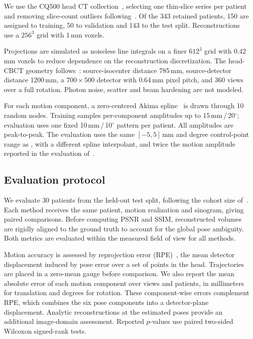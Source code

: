 \documentclass[11pt]{article}
\begin{document}
We use the CQ500 head CT collection~\cite{cq500}, selecting one thin-slice series per
patient and removing slice-count outliers following~\cite{thies25}. Of the 343
retained patients, 150 are assigned to training, 50 to validation and 143 to the test
split. Reconstructions use a $256^3$ grid with 1\,mm voxels.

Projections are simulated as noiseless line integrals on a finer $612^3$ grid with
0.42\,mm voxels to reduce dependence on the reconstruction discretization. The
head-CBCT geometry follows~\cite{thies25}: source-isocenter distance 785\,mm,
source-detector distance 1200\,mm, a $700\times500$ detector with 0.64\,mm pixel
pitch, and 360 views over a full rotation. Photon noise, scatter and beam hardening
are not modeled.

For each motion component, a zero-centered Akima spline~\cite{akima70} is drawn through
10 random nodes. Training samples per-component amplitudes up to
15\,mm\,/\,20$^\circ$; evaluation uses one fixed
10\,mm\,/\,10$^\circ$ pattern per patient. All amplitudes are peak-to-peak.
The evaluation uses the same $[-5,5]$\,mm and degree control-point range as
\cite{depaepe25}, with a different spline interpolant, and twice the motion amplitude
reported in the evaluation of~\cite{thies25}.

\subsection{Evaluation protocol}
\label{sec:protocol}

We evaluate 30 patients from the held-out test split, following the cohort size
of~\cite{thies25}. Each method receives the same patient, motion realization and
sinogram, giving paired comparisons. Before computing PSNR and SSIM, reconstructed
volumes are rigidly aligned to the ground truth to account for the global pose
ambiguity. Both metrics are evaluated within the measured field of view for all methods.

Motion accuracy is assessed by reprojection error (RPE)~\cite{thies25}, the mean
detector displacement induced by pose error over a set of points in the head.
Trajectories are placed in a zero-mean gauge before comparison. We also report the
mean absolute error of each motion component over views and patients, in millimeters
for translation and degrees for rotation. These component-wise errors complement RPE,
which combines the six pose components into a detector-plane displacement.
Analytic reconstructions at the estimated poses provide an additional image-domain
assessment. Reported $p$-values use paired two-sided Wilcoxon signed-rank tests.
\end{document}
